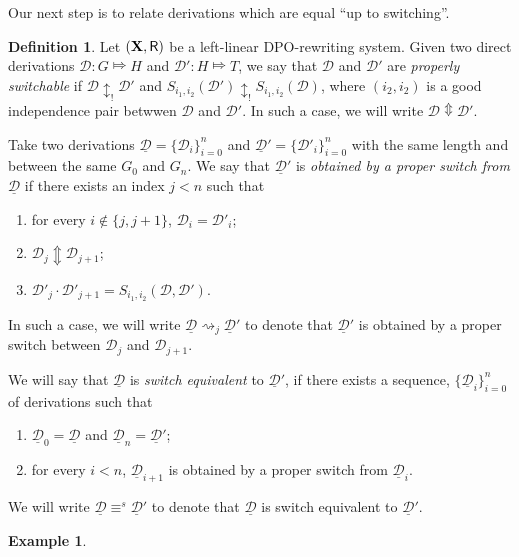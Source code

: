 \documentclass[a4paper]{article}
\def\R{\mathsf{R}}
\def\X{\textbf {\textup{X}}}
\newcommand{\dder}[1]{\mathscr{#1}}
\newcommand{\der}[1]{\underline{\dder{#1}}}
\theoremstyle{definition}
\newtheorem{definition}[theorem]{Definition}
\newtheorem{example}[theorem]{Example}
\begin{document}
Our next step is to relate derivations which are equal ``up to switching''.

\begin{definition} Let $(\X, \R)$ be a left-linear DPO-rewriting system. Given two direct derivations $\dder{D}\colon G\Mapsto H$ and $\dder{D}'\colon H\Mapsto T$, we say that  $\dder{D}$ and $\dder{D}'$ are \emph{properly switchable} if $\dder{D}\updownarrow_! \dder{D'}$ and $S_{i_1,i_2}(\dder{D}')\updownarrow_!S_{i_1,i_2}(\dder{D})$, where $(i_2,i_2)$ is a good independence pair betwwen $\dder{D}$ and $\dder{D}'$. In such a case, we will write $\dder{D}\Updownarrow\dder{D}'$. 
	
Take two derivations $\der{D}=\{\dder{D}_{i}\}_{i=0}^n$ and $\der{D}'=\{\dder{D}'_{i}\}_{i=0}^n$ with the same length and between the same $G_0$ and $G_n$. We say that $\der{D}'$ is \emph{obtained by a proper switch from $\der{D}$} if there exists an index $j < n$ such that
	\begin{enumerate}
\item for every $i\notin \{j, j+1\} $, $\dder{D}_i=\dder{D}'_i$;
\item $\dder{D}_j \Updownarrow \dder{D}_{j+1}$;		
\item $\dder{D}'_j\cdot \dder{D}'_{j+1} = S_{i_1,i_2}(\dder{D}, \dder{D}')$.
	\end{enumerate}
	In such a case, we will write $\der{D}\rightsquigarrow_j \der{D}'$ to denote that $\der{D}'$ is obtained by a proper switch between $\dder{D}_j$ and $\dder{D}_{j+1}$. 
	
	We will say that $\der{D}$ is \emph{switch equivalent} to $\der{D}'$, if there exists a sequence, $\{\der{D}_i\}_{i=0}^n$ of derivations such that
	\begin{enumerate}
		\item $\der{D}_0=\der{D}$ and $\der{D}_n=\der{D}'$;
		\item for every $i< n$, $\der{D}_{i+1}$ is obtained by a proper switch from $\der{D}_i$.
	\end{enumerate}
	
	We will write $\der{D} \equiv^s \der{D}'$ to denote that $\der{D}$ is switch equivalent to $\der{D}'$.
\end{definition}


\begin{example}
\end{example}
\end{document}
